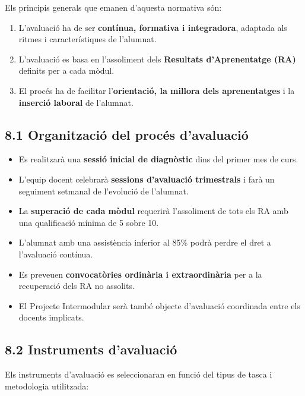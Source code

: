 \documentclass[
  paper=a4,
  ,captions=tableheading
]{scrartcl}
\providecommand{\tightlist}{%
  \setlength{\itemsep}{0pt}\setlength{\parskip}{0pt}}
\begin{document}
Els principis generals que emanen d'aquesta normativa són:

\begin{enumerate}
\def\labelenumi{\arabic{enumi}.}
\tightlist
\item
  L'avaluació ha de ser \textbf{contínua, formativa i integradora},
  adaptada als ritmes i característiques de l'alumnat.
\item
  L'avaluació es basa en l'assoliment dels \textbf{Resultats
  d'Aprenentatge (RA)} definits per a cada mòdul.
\item
  El procés ha de facilitar l'\textbf{orientació, la millora dels
  aprenentatges} i la \textbf{inserció laboral} de l'alumnat.
\end{enumerate}

\hypertarget{organitzaciuxf3-del-procuxe9s-davaluaciuxf3}{%
\subsection{8.1 Organització del procés
d'avaluació}\label{organitzaciuxf3-del-procuxe9s-davaluaciuxf3}}

\begin{itemize}
\tightlist
\item
  Es realitzarà una \textbf{sessió inicial de diagnòstic} dins del
  primer mes de curs.
\item
  L'equip docent celebrarà \textbf{sessions d'avaluació trimestrals} i
  farà un seguiment setmanal de l'evolució de l'alumnat.
\item
  La \textbf{superació de cada mòdul} requerirà l'assoliment de tots els
  RA amb una qualificació mínima de 5 sobre 10.
\item
  L'alumnat amb una assistència inferior al 85\% podrà perdre el dret a
  l'avaluació contínua.
\item
  Es preveuen \textbf{convocatòries ordinària i extraordinària} per a la
  recuperació dels RA no assolits.
\item
  El Projecte Intermodular serà també objecte d'avaluació coordinada
  entre els docents implicats.
\end{itemize}

\hypertarget{instruments-davaluaciuxf3}{%
\subsection{8.2 Instruments
d'avaluació}\label{instruments-davaluaciuxf3}}

Els instruments d'avaluació es seleccionaran en funció del tipus de
tasca i metodologia utilitzada:
\end{document}
